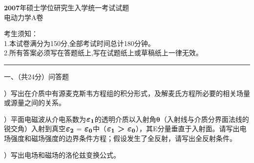 \begin{center}
	\heiti
	\LARGE{$\boldsymbol{2007}$年硕士学位研究生入学统一考试试题\\
	电动力学A卷}

\end{center}
\noindent
考生须知：\\
1.本试卷满分为150分,全部考试时间总计180分钟。\\
2.所有答案必须写在答题纸上,写在试题纸上或草稿纸上一律无效。

\vspace*{2ex}
\hrule
\vspace*{4ex}


\setcounter{page}{1}%
\pagestyle{mypagestyle}

\onehalfspacing
\vspace{0.8cm}

\noindent
一、（共24分）问答题

）\hspace{0.2em}写出在介质中有源麦克斯韦方程组的积分形式，及解麦氏方程所必要的相关场量或源量之间的关系。
\vspace{0.2cm}

）\hspace{0.2em}平面电磁波从介电系数为$\large{\boldsymbol{\varepsilon_1}}$的透明介质以入射角$\boldsymbol{\theta}$（入射线与介质分界面法线的锐交角）入射到真空$\large{\boldsymbol{\varepsilon_2}}$ = $\large{\boldsymbol{\varepsilon_0}}$中（$\large{\boldsymbol{\varepsilon_1 > \varepsilon_0}}$），其E分量垂直于入射面。请写出电场强度和磁场强度的边界条件方程；假设发生了全反射，请写出全反射条件。
\vspace{0.2cm}

）\hspace{0.2em}写出电场和磁场的洛伦兹变换公式。

